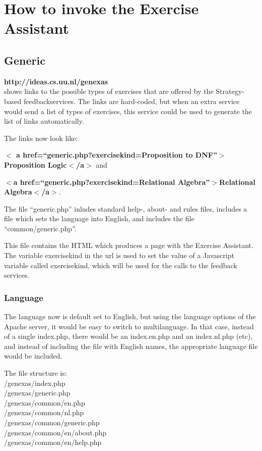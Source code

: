 \documentclass{article}
\begin{document}
\section{How to invoke the Exercise Assistant}
\subsection{Generic}
\textbf{http://ideas.cs.uu.nl/genexas} \\
shows links to the possible types of exercises that are
offered by the Strategy-based feedbackservices. The links are hard-coded, but when an
extra service would send a list of types of exercises, this service could be used to 
generate the list of links automatically.

The links now look like:

\textbf{$<$ a href=``generic.php?exercisekind=Proposition to DNF''$>$Proposition Logic$<$/a$>$} and

\textbf{$<$a href=``generic.php?exercisekind=Relational Algebra''$>$Relational Algebra$<$/a$>$}.


The file ``generic.php'' inludes standard help-, about- and rules files, includes a file which sets the language into English, and includes the file ``common/generic.php''.

This file contains the HTML which produces a page with the Exercise Assistant. The variable exercisekind in the url is used to set the value of a Javascript variable called exercisekind, which will be used for the calls to the feedback services.

\subsubsection{Language}
The language now is default set to English, but using the language options of the Apache server, it would be easy to switch to multilanguage. In that case, instead of a single index.php, there would be an index.en.php and an index.nl.php (etc), and instead of including the file with English names, the appropriate language file would be included.

The file structure is:\\
/genexas/index.php \\
/genexas/generic.php \\
/genexas/common/en.php \\
/genexas/common/nl.php \\
/genexas/common/generic.php \\
/genexas/common/en/about.php \\
/genexas/common/en/help.php \\
\end{document}
